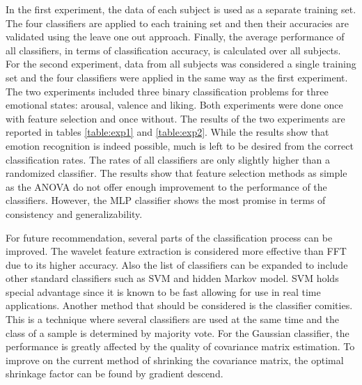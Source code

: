 \documentclass[12pt, a4paper, fleqn]{memoir}%
\begin{document}
In the first experiment, the data of each subject is used as a separate training set. The four classifiers are applied to each training set and then their accuracies are validated using the leave one out approach. Finally, the average performance of all classifiers, in terms of classification accuracy, is calculated over all subjects. For the second experiment, data from all subjects was considered a single training set and the four classifiers were applied in the same way as the first experiment. The two experiments included three binary classification problems for three emotional states: arousal, valence and liking. Both experiments were done once with feature selection and once without. The results of the two experiments are reported in tables \ref{table:exp1} and \ref{table:exp2}. While the results show that emotion recognition is indeed possible, much is left to be desired from the correct classification rates. The rates of all classifiers are only slightly higher than a randomized classifier. The results show that feature selection methods as simple as the ANOVA do not offer enough improvement to the performance of the classifiers. However, the MLP classifier shows the most promise in terms of consistency and generalizability.

For future recommendation, several parts of the classification process can be improved. The wavelet feature extraction is considered more effective than FFT due to its higher accuracy. Also the list of classifiers can be expanded to include other standard classifiers such as SVM and hidden Markov model. SVM holds special advantage since it is known to be fast allowing for use in real time applications. Another method that should be considered is the classifier comities. This is a technique where several classifiers are used at the same time and the class of a sample is determined by majority vote. For the Gaussian classifier, the performance is greatly affected by the quality of covariance matrix estimation. To improve on the current method of shrinking the covariance matrix, the optimal shrinkage factor can be found by gradient descend. 


\small{}


\appendix
\appendixpage*
\end{document}
